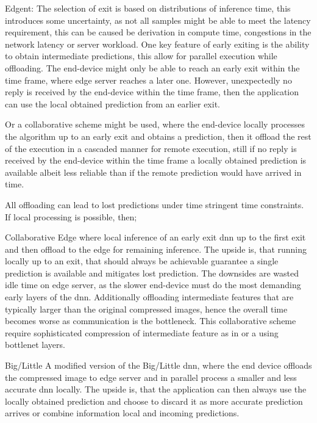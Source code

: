 Edgent: The selection of exit is based on distributions of inference time, this introduces some uncertainty, as not all samples might be able to meet the latency requirement, this can be caused be derivation in compute time, congestions in the network latency or server workload. One key feature of early exiting is the ability to obtain intermediate predictions, this allow for parallel execution while offloading. The end-device might only be able to reach an early exit within the time frame, where edge server reaches a later one. However, unexpectedly no reply is received by the end-device within the time frame, then the application can use the local obtained prediction from an earlier exit. 

Or a collaborative scheme might be used, where the end-device locally processes the algorithm up to an early exit and obtains a prediction, then it offload the rest of the execution in a cascaded manner for remote execution, still if no reply is received by the end-device within the time frame a locally obtained prediction is available albeit less reliable than if the remote prediction would have arrived in time. 

All offloading can lead to lost predictions under time stringent time constraints. If local processing is possible, then;

\begin{enumdescript}
	\item[Collaborative Edge] where local inference of an early exit \gls{dnn} up to the first exit and then offload to the edge for remaining inference. The upside is, that running locally up to an exit, that should always be achievable guarantee a single prediction is available and mitigates lost prediction. The downsides are wasted idle time on edge server, as the slower end-device must do the most demanding early layers of the \gls{dnn}. Additionally offloading intermediate features that are typically larger than the original compressed images, hence the overall time becomes worse as communication is the bottleneck. This collaborative scheme require sophisticated compression of intermediate feature as in \cite{choi_near-lossless_2018} or a using \gls{bottlenet} layers.
	\item[Big/Little] A modified version of the Big/Little \gls{dnn}, where the end device offloads the compressed image to edge server and in parallel process a smaller and less accurate \gls{dnn} locally. The upside is, that the application can then always use the locally obtained prediction and choose to discard it as more accurate prediction arrives or combine information local and incoming predictions.
\end{enumdescript}

